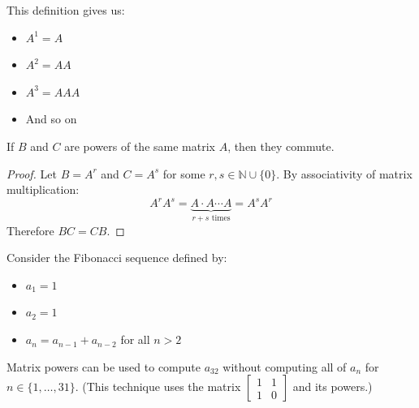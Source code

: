 \begin{note}
    This definition gives us:
    \begin{itemize}
        \item $A^1 = A$
        \item $A^2 = AA$
        \item $A^3 = AAA$
        \item And so on
    \end{itemize}
\end{note}

\begin{proposition}\label{prop:powers-commute}
    If $B$ and $C$ are powers of the same matrix $A$, then they commute.
\end{proposition}

\begin{proof}
    Let $B = A^r$ and $C = A^s$ for some $r, s \in \mathbb{N} \cup \{0\}$. By associativity of matrix multiplication:
    \[
    A^r A^s = \underbrace{A \cdot A \cdots A}_{r+s \text{ times}} = A^s A^r
    \]
    Therefore $BC = CB$.
\end{proof}

\begin{eg}
    Consider the Fibonacci sequence defined by:
    \begin{itemize}
        \item $a_1 = 1$
        \item $a_2 = 1$
        \item $a_n = a_{n-1} + a_{n-2}$ for all $n > 2$
    \end{itemize}
    Matrix powers can be used to compute $a_{32}$ without computing all of $a_n$ for $n \in \{1, \ldots, 31\}$. (This technique uses the matrix $\begin{bmatrix} 1 & 1 \\ 1 & 0 \end{bmatrix}$ and its powers.)
\end{eg}